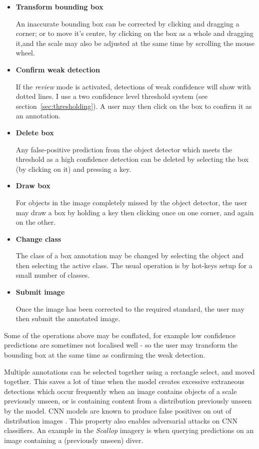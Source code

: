 \begin{itemize}
    \item {\bf Transform bounding box}\par
An inaccurate bounding box can be corrected by clicking and dragging a corner; or to move it's centre, by clicking on the box as a whole and dragging it,and  the scale may also be adjusted at the same time by scrolling the mouse wheel.
    \item {\bf Confirm weak detection}\par
If the \emph{review} mode is activated, detections of weak confidence will show with dotted lines. I use a two confidence level threshold system (see section~\ref{sec:thresholding}). A user may then click on the box to confirm it as an annotation.
    \item {\bf Delete box}\par
Any false-positive prediction from the object detector which meets the threshold as a high confidence detection can be deleted by selecting the box (by clicking on it) and pressing a key. 
    \item {\bf Draw box}\par
For objects in the image completely missed by the object detector, the user may draw a box by holding a key then clicking once on one corner, and again on the other.
    \item {\bf Change class}\par
The class of a box annotation may be changed by selecting the object and then selecting the active class. The usual operation is by hot-keys setup for a small number of classes.
    \item {\bf Submit image}\par
Once the image has been corrected to the required standard, the user may then submit the annotated image.
\end{itemize}

Some of the operations above may be conflated, for example low confidence predictions are sometimes not localised well - so the user may transform the bounding box at the same time as confirming the weak detection.


Multiple annotations can be selected together using a rectangle select, and moved together.  This saves a lot of time when the model creates excessive extraneous detections which occur frequently when an image contains objects of a scale previously unseen, or is containing content from a distribution previously unseen by the model. \gls{CNN} models are known to produce false positives on out of distribution images \cite{Hendrycks2016,Lee2018}. This property also enables adversarial attacks on \gls{CNN} classifiers. An example in the \emph{Scallop} imagery is when querying predictions on an image containing a (previously unseen) diver.



